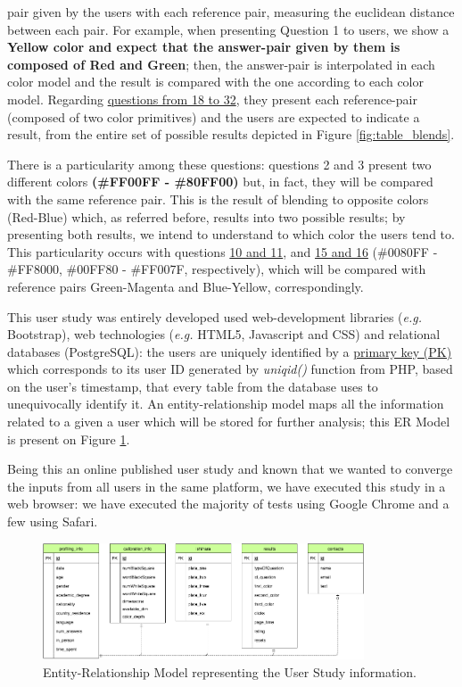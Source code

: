 pair given by the users with each reference pair, measuring the euclidean distance between each pair. For example, when presenting Question 1 to users,
we show a \textbf{Yellow color and expect that the answer-pair given by them is composed of Red and Green}; then, the answer-pair is interpolated in each
color model and the result is compared with the one according to each color model. Regarding \ul{questions from 18 to 32}, they present each reference-pair
(composed of two color primitives) and the users are expected to indicate a result, from the entire set of possible results depicted in Figure
\ref{fig:table_blends}. \par
%
There is a particularity among these questions: questions 2 and 3 present two different colors \textbf{(\#FF00FF - \#80FF00)} but, in fact, they will be compared with
the same reference pair. This is the result of blending to opposite colors (Red-Blue) which, as referred before, results into two possible results; by
presenting both results, we intend to understand to which color the users tend to. This particularity occurs with questions \ul{10 and 11}, and \ul{15 and 16}
(\#0080FF - \#FF8000, \#00FF80 - \#FF007F, respectively), which will be compared with reference pairs Green-Magenta and Blue-Yellow, correspondingly. \par
%
This user study was entirely developed used web-development libraries (\emph{e.g.} Bootstrap), web technologies (\emph{e.g.} HTML5, Javascript
and CSS) and relational databases (PostgreSQL): the users are uniquely identified by a \ul{primary key (PK)} which corresponds to its user ID generated
by \emph{uniqid()} function from PHP, based on the user's timestamp, that every table from the database uses to unequivocally identify it.
An entity-relationship model maps all the information related to a given a user which will be stored for further analysis; this ER Model is present on
Figure \ref{fig:er_model}. \par
%
Being this an online published user study and known that we wanted to converge the inputs from all users in the same platform, we have executed this study
in a web browser: we have executed the majority of tests using Google Chrome and a few using Safari.
%
\begin{figure}[htbp]
	\centering
  \includegraphics[width=0.85\textwidth]{images/implementation/tables_schema.png}
  \caption[Entity-Relationship Model representing the User Study information.]{Entity-Relationship Model representing the User Study information.}
  \label{fig:er_model}
\end{figure}
%
%
